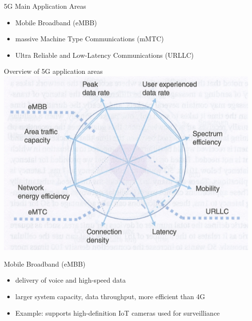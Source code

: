 \documentclass{beamer}
\begin{document}
\begin{frame}{5G Main Application Areas}
  \vspace*{1.6em}
  \begin{itemize}
    \item Mobile Broadband (eMBB)
    \vspace*{0.75em}
    \item massive Machine Type Communications (mMTC)
    \vspace*{0.75em}
    \item Ultra Reliable and Low-Latency Communications (URLLC)
  \end{itemize}
\end{frame}

\begin{frame}{Overview of 5G application areas}
  \hspace*{0.6em}
  \includegraphics[scale=0.45]{beamer/fig/5g_application_areas.png}
\end{frame}

\begin{frame}{Mobile Broadband (eMBB)}
  \vspace*{1.6em}
  \begin{itemize}
    \item delivery of voice and high-speed data
    \vspace*{0.75em}
    \item larger system capacity, data throughput, more efficient than 4G
    \vspace*{0.75em}
    \item Example: supports high-definition IoT cameras used for surveilliance
  \end{itemize}
\end{frame}
\end{document}
